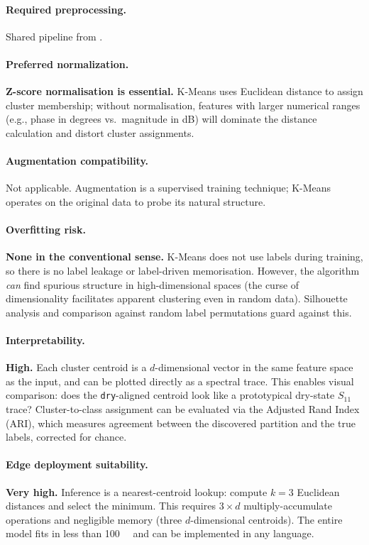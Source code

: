 \paragraph{Required preprocessing.}
Shared pipeline from .

\paragraph{Preferred normalization.}
\textbf{Z-score normalisation is essential.}  K-Means uses Euclidean
distance to assign cluster membership; without normalisation, features
with larger numerical ranges (e.g., phase in degrees vs.\ magnitude
in dB) will dominate the distance calculation and distort cluster
assignments.

\paragraph{Augmentation compatibility.}
Not applicable.  Augmentation is a supervised training technique;
K-Means operates on the original data to probe its natural structure.

\paragraph{Overfitting risk.}
\textbf{None in the conventional sense.}  K-Means does not use labels
during training, so there is no label leakage or label-driven
memorisation.  However, the algorithm \emph{can} find spurious
structure in high-dimensional spaces (the curse of dimensionality
facilitates apparent clustering even in random data).  Silhouette
analysis and comparison against random label permutations guard
against this.

\paragraph{Interpretability.}
\textbf{High.}  Each cluster centroid is a $d$-dimensional vector in
the same feature space as the input, and can be plotted directly as a
spectral trace.  This enables visual comparison: does the
\texttt{dry}-aligned centroid look like a prototypical dry-state
$S_{11}$ trace?  Cluster-to-class assignment can be evaluated via the
Adjusted Rand Index (ARI), which measures agreement between the
discovered partition and the true labels, corrected for chance.

\paragraph{Edge deployment suitability.}
\textbf{Very high.}  Inference is a nearest-centroid lookup: compute
$k = 3$ Euclidean distances and select the minimum.  This requires
$3 \times d$ multiply-accumulate operations and negligible memory
(three $d$-dimensional centroids).  The entire model fits in less than
\SI{100}{\kilo\byte} and can be implemented in any language.

